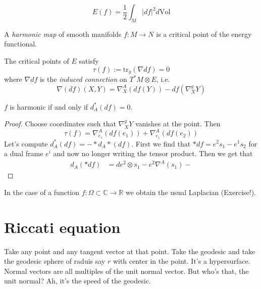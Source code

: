 \documentclass{book}
\begin{document}
\begin{definition}
\label{definition-energy-functional}
$$
E(f)=\frac{1}{2}\int_M|df|^2d\text{Vol}
$$
\end{definition}

\begin{definition}
\label{definition-harmonic-map}
A {\it harmonic map} of smooth manifolds
$f:M\to N$ is a critical point of the
energy functional.
\end{definition}

\begin{lemma}
\label{lemma-criti-point-energ-funct}
The critical points of $E$ satisfy
$$
\tau(f):=\text{tr}_g(\nabla df)=0
$$
where $\nabla df$ is the {\it induced
connection} on $T^*M\otimes E$, i.e.
$$
\nabla(df)(X,Y)=\nabla_X^A(df(Y))-
df(\nabla_X^gY)
$$
\end{lemma}

\begin{lemma}
\label{lemma-harmonic}
$f$ is harmonic if and only if $d_A^*(df)=0$.
\end{lemma}

\begin{proof}
Choose coordinates such that $\nabla^g_XY$
vanishes at the point. Then
$$
\tau(f)=\nabla^A_{e_1}(df(e_1))+
\nabla^A_{e_1}(df(e_2))
$$
Let's compute $d_A^*(df)=-*d_A*(df)$. First
we find that $*df=e^2s_1-e^1s_2$ for
a dual frame $e^i$ and now no longer writing
the tensor product. Then we get
that
$$
\begin{aligned}
d_A(*df)&=de^2\otimes s_1-e^2\nabla^A(s_1)-
\end{aligned}
$$

\end{proof}

\begin{remark}
\label{remark-harmonic-functions}
In the case of a function
$f:\Omega\subset\mathbb{C}\to \mathbb{R}$ we
obtain
the usual Laplacian (Exercise!).
\end{remark}

\section{Riccati equation}
\label{section-Riccati-equation}

Take any point and any tangent vector at that
point. Take the geodesic and take
the geodesic sphere of raduis say $r$ with
center in the point. It's
a hypersurface. Normal vectors are all
multiples of the unit normal vector. But
who's that, the unit normal? Ah, it's the
speed of the geodesic.
\end{document}
